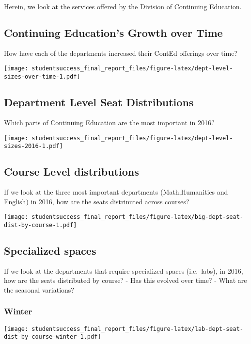 \documentclass[]{book}
\theoremstyle{definition}
\theoremstyle{definition}
\theoremstyle{remark}
\begin{document}
Herein, we look at the services offered by the Division of Continuing
Education.

\subsection{Continuing Education's Growth over
Time}\label{continuing-educations-growth-over-time}

How have each of the departments increased their ContEd offerings over
time?

\texttt{[image: studentsuccess\_final\_report\_files/figure-latex/dept-level-sizes-over-time-1.pdf]}

\subsection{Department Level Seat
Distributions}\label{department-level-seat-distributions}

Which parts of Continuing Education are the most important in 2016?

\texttt{[image: studentsuccess\_final\_report\_files/figure-latex/dept-level-sizes-2016-1.pdf]}

\subsection{Course Level
distributions}\label{course-level-distributions}

If we look at the three most important departments (Math,Humanities and
English) in 2016, how are the seats distrinuted across courses?

\texttt{[image: studentsuccess\_final\_report\_files/figure-latex/big-dept-seat-dist-by-course-1.pdf]}

\subsection{Specialized spaces}\label{specialized-spaces}

If we look at the departments that require specialized spaces
(i.e.~labs), in 2016, how are the seats distributed by course? - Has
this evolved over time? - What are the seasonal variations?

\subsubsection{Winter}\label{winter}

\texttt{[image: studentsuccess\_final\_report\_files/figure-latex/lab-dept-seat-dist-by-course-winter-1.pdf]}
\end{document}
